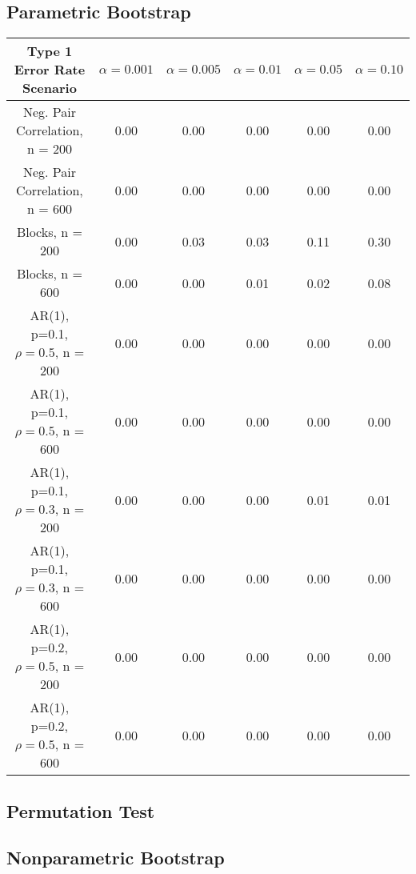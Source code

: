 \documentclass[12pt, letterpaper]{article}
\begin{document}
\subsection{Parametric Bootstrap}
\begin{tabular}{|c|c|c|c|c|c|}
\hline
\textbf{Type 1 Error Rate Scenario} & $\alpha = 0.001$ &  $\alpha = 0.005$ &  $\alpha = 0.01$ &  $\alpha = 0.05$ &  $\alpha = 0.10$ \\
\hline
Neg. Pair Correlation, n = 200 & 0.00 & 0.00 & 0.00 & 0.00 & 0.00 \\
\hline
Neg. Pair Correlation, n = 600 & 0.00 & 0.00 & 0.00 & 0.00 & 0.00 \\
\hline
Blocks, n = 200 & 0.00 & 0.03 & 0.03 & 0.11 & 0.30 \\
\hline
Blocks, n = 600 & 0.00 & 0.00 & 0.01 & 0.02 & 0.08 \\
\hline
AR(1), p=0.1, $\rho = 0.5$, n = 200 & 0.00 & 0.00 & 0.00 & 0.00 & 0.00 \\
\hline
AR(1), p=0.1, $\rho = 0.5$, n = 600 & 0.00 & 0.00 & 0.00 & 0.00 & 0.00 \\
\hline
AR(1), p=0.1, $\rho = 0.3$, n = 200 & 0.00 & 0.00 & 0.00 & 0.01 & 0.01 \\
\hline
AR(1), p=0.1, $\rho = 0.3$, n = 600 & 0.00 & 0.00 & 0.00 & 0.00 & 0.00 \\
\hline
AR(1), p=0.2, $\rho = 0.5$, n = 200 & 0.00 & 0.00 & 0.00 & 0.00 & 0.00 \\
\hline
AR(1), p=0.2, $\rho = 0.5$, n = 600 & 0.00 & 0.00 & 0.00 & 0.00 & 0.00 \\
\hline
\end{tabular}

\subsection{Permutation Test}

\subsection{Nonparametric Bootstrap}
\end{document}
